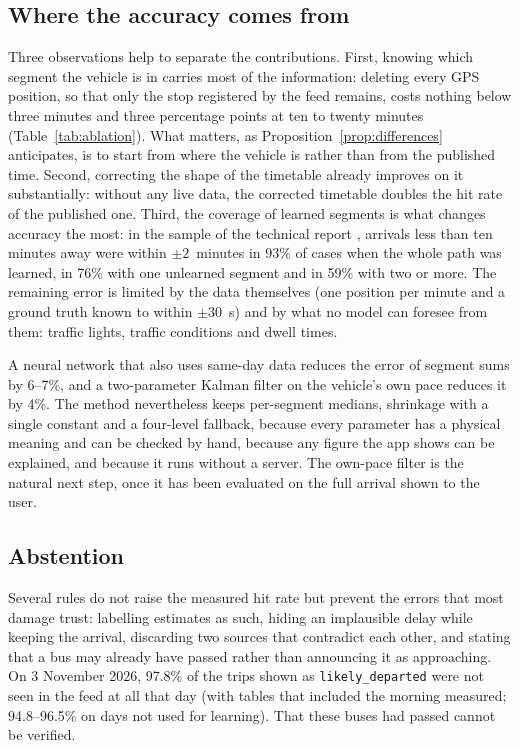 
\subsection{Where the accuracy comes from}

Three observations help to separate the contributions. First, knowing which segment the vehicle is in carries most of
the information: deleting every GPS position, so that only the stop registered by the feed remains, costs nothing
below three minutes and three percentage points at ten to twenty minutes (Table~\ref{tab:ablation}). What matters, as
Proposition~\ref{prop:differences} anticipates, is to start from where the vehicle is rather than from the published
time. Second, correcting the shape of the timetable already improves on it substantially: without any live data, the
corrected timetable doubles the hit rate of the published one. Third, the coverage of learned segments is what changes
accuracy the most: in the sample of the technical report \parencite{garrido2026memoria}, arrivals less than ten minutes
away were within $\pm2$~minutes in 93\% of cases when the whole path was learned, in 76\% with one unlearned segment and
in 59\% with two or more. The remaining error is limited by the data themselves (one position per minute and a ground
truth known to within $\pm30$~s) and by what no model can foresee from them: traffic lights, traffic conditions and
dwell times.

A neural network that also uses same-day data reduces the error of segment sums by 6--7\%, and a two-parameter Kalman
filter on the vehicle's own pace reduces it by 4\%. The method nevertheless keeps per-segment medians, shrinkage with a
single constant and a four-level fallback, because every parameter has a physical meaning and can be checked by hand,
because any figure the app shows can be explained, and because it runs without a server. The own-pace filter is the
natural next step, once it has been evaluated on the full arrival shown to the user.

\subsection{Abstention}

Several rules do not raise the measured hit rate but prevent the errors that most damage trust: labelling estimates as
such, hiding an implausible delay while keeping the arrival, discarding two sources that contradict each other, and
stating that a bus may already have passed rather than announcing it as approaching. On 3 November 2026, 97.8\% of the
trips shown as \texttt{likely\_departed} were not seen in the feed at all that day (with tables that included the
morning measured; 94.8--96.5\% on days not used for learning). That these buses had passed cannot be verified.

